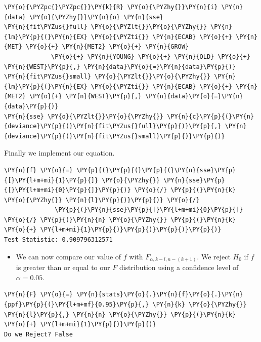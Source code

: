 \documentclass[10pt]{article}\usepackage[]{graphicx}\usepackage[]{xcolor}
\begin{document}
    \begin{Verbatim}[commandchars=\\\{\}]
\PY{o}{\PYZpc{}\PYZpc{}}\PY{k}{R} \PY{o}{\PYZhy{}}\PY{n}{i} \PY{n}{data} \PY{o}{\PYZhy{}}\PY{n}{o} \PY{n}{sse}
\PY{n}{fit\PYZus{}full} \PY{o}{\PYZlt{}}\PY{o}{\PYZhy{}} \PY{n}{lm}\PY{p}{(}\PY{n}{EX} \PY{o}{\PYZti{}} \PY{n}{ECAB} \PY{o}{+} \PY{n}{MET} \PY{o}{+} \PY{n}{MET2} \PY{o}{+} \PY{n}{GROW}
             \PY{o}{+} \PY{n}{YOUNG} \PY{o}{+} \PY{n}{OLD} \PY{o}{+} \PY{n}{WEST}\PY{p}{,} \PY{n}{data}\PY{o}{=}\PY{n}{data}\PY{p}{)}
\PY{n}{fit\PYZus{}small} \PY{o}{\PYZlt{}}\PY{o}{\PYZhy{}} \PY{n}{lm}\PY{p}{(}\PY{n}{EX} \PY{o}{\PYZti{}} \PY{n}{ECAB} \PY{o}{+} \PY{n}{MET2} \PY{o}{+} \PY{n}{WEST}\PY{p}{,} \PY{n}{data}\PY{o}{=}\PY{n}{data}\PY{p}{)}
\PY{n}{sse} \PY{o}{\PYZlt{}}\PY{o}{\PYZhy{}} \PY{n}{c}\PY{p}{(}\PY{n}{deviance}\PY{p}{(}\PY{n}{fit\PYZus{}full}\PY{p}{)}\PY{p}{,} \PY{n}{deviance}\PY{p}{(}\PY{n}{fit\PYZus{}small}\PY{p}{)}\PY{p}{)}
\end{Verbatim}

    Finally we implement our equation.

\begin{Verbatim}[commandchars=\\\{\}]
\PY{n}{f} \PY{o}{=} \PY{p}{(}\PY{p}{(}\PY{p}{(}\PY{n}{sse}\PY{p}{[}\PY{l+m+mi}{1}\PY{p}{]} \PY{o}{\PYZhy{}} \PY{n}{sse}\PY{p}{[}\PY{l+m+mi}{0}\PY{p}{]}\PY{p}{)} \PY{o}{/} \PY{p}{(}\PY{n}{k} \PY{o}{\PYZhy{}} \PY{n}{l}\PY{p}{)}\PY{p}{)} \PY{o}{/}
              \PY{p}{(}\PY{n}{sse}\PY{p}{[}\PY{l+m+mi}{0}\PY{p}{]} \PY{o}{/} \PY{p}{(}\PY{n}{n} \PY{o}{\PYZhy{}} \PY{p}{(}\PY{n}{k} \PY{o}{+} \PY{l+m+mi}{1}\PY{p}{)}\PY{p}{)}\PY{p}{)}\PY{p}{)}
Test Statistic: 0.909796312571
\end{Verbatim}

    \begin{itemize}
\itemsep1pt\parskip0pt
\item
  We can now compare our value of $f$ with $F_{\alpha, k - l, n - (k + 1)}$. We reject $H_0$ if $f$ is greater than or
  equal to our $F$ distribution using a confidence level of $\alpha = 0.05$.
\end{itemize}

\begin{Verbatim}[commandchars=\\\{\}]
\PY{n}{F} \PY{o}{=} \PY{n}{stats}\PY{o}{.}\PY{n}{f}\PY{o}{.}\PY{n}{ppf}\PY{p}{(}\PY{l+m+mf}{0.95}\PY{p}{,} \PY{n}{k} \PY{o}{\PYZhy{}} \PY{n}{l}\PY{p}{,} \PY{n}{n} \PY{o}{\PYZhy{}} \PY{p}{(}\PY{n}{k} \PY{o}{+} \PY{l+m+mi}{1}\PY{p}{)}\PY{p}{)}
Do we Reject? False
\end{Verbatim}
\end{document}
